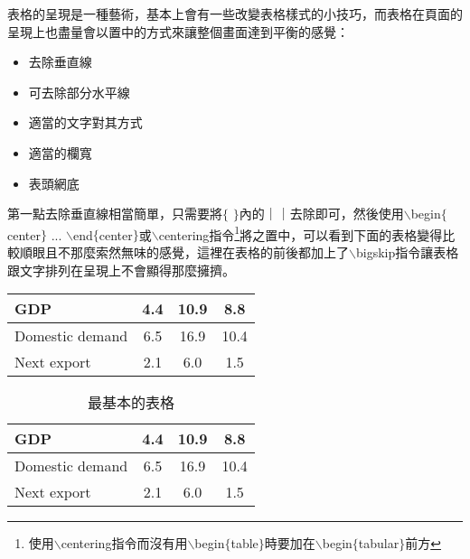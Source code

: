表格的呈現是一種藝術，基本上會有一些改變表格樣式的小技巧，而表格在頁面的呈現上也盡量會以置中的方式來讓整個畫面達到平衡的感覺：
\begin{itemize}
\item 去除垂直線
\item 可去除部分水平線
\item 適當的文字對其方式
\item 適當的欄寬
\item 表頭網底
\end{itemize}
第一點去除垂直線相當簡單，只需要將$\lbrace$ $\rbrace$內的｜｜去除即可，然後使用$\backslash$begin$\lbrace$center$\rbrace$ ... $\backslash$end$\lbrace$center$\rbrace$或$\backslash$centering指令\footnote{使用$\backslash$centering指令而沒有用$\backslash$begin$\lbrace$table$\rbrace$時要加在$\backslash$begin$\lbrace$tabular$\rbrace$前方}將之置中，可以看到下面的表格變得比較順眼且不那麼索然無味的感覺，這裡在表格的前後都加上了$\backslash$bigskip指令讓表格跟文字排列在呈現上不會顯得那麼擁擠。\\
\begin{center} 
\begin{tabular}{lccc}
\hline  %
  GDP  & 4.4  & 10.9 & 8.8		\\\hline  %
  Domestic demand     & 6.5     & 16.9 & 10.4		\\\hline
  Next export  & 2.1     & 6.0	& 1.5		\\\hline
\end{tabular}
\end{center}
\begin{table}[h] %
    \centering %
    \caption{最基本的表格}\label{basic_1}  %
    \bigskip
	\begin{tabular}{|l|ccc|}%
	\hline  %
  GDP  & 4.4  & 10.9 & 8.8		\\\hline  %
  Domestic demand     & 6.5     & 16.9 & 10.4		\\\hline
  Next export  & 2.1     & 6.0	& 1.5		\\\hline
	\end{tabular}
\end{table}

